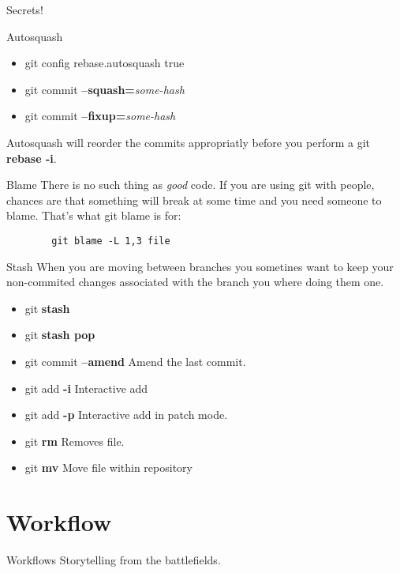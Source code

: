 \documentclass{beamer}
\begin{document}
\begin{frame}{Secrets!}
  \begin{block}{Autosquash}
    \begin{itemize}
      \item git config rebase.autosquash true
      \item git commit \textbf{--squash=}\emph{some-hash}
      \item git commit \textbf{--fixup=}\emph{some-hash}
     \end{itemize}
     Autosquash will reorder the commits appropriatly before you perform a git \textbf{rebase -i}.
  \end{block}
  \begin{block}{Blame}
    There is no such thing as \textit{good} code. If you are using git with people, chances are that something will break at some time and you need someone to blame. That's what git blame is for:
    \begin{lstlisting}
        git blame -L 1,3 file
    \end{lstlisting}
  \end{block}
  \framebreak
  \begin{block}{Stash}
    When you are moving between branches you sometines want to keep your non-commited changes associated with the branch you where doing them one.
    \begin{itemize}
      \item git \textbf{stash}
      \item git \textbf{stash pop}
    \end{itemize}
  \end{block}

  \begin{itemize}
    \item git commit \textbf{--amend} Amend the last commit.
    \item git add \textbf{-i} Interactive add
    \item git add \textbf{-p} Interactive add in patch mode.
    \item git \textbf{rm} Removes file.
    \item git \textbf{mv} Move file within repository
  \end{itemize}
\end{frame}


\section{Workflow}
\begin{frame}{Workflows}
  \centering
  Storytelling from the battlefields.
\end{frame}
\end{document}
